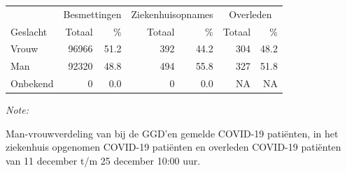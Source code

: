 \documentclass[
  english,
  man,floatsintext]{apa6}
\begin{document}
\begin{table}
\centering\begingroup\fontsize{11}{13}\selectfont

\begin{threeparttable}
\begin{tabular}{lrrrrrr}
\toprule
\multicolumn{1}{c}{ } & \multicolumn{2}{c}{Besmettingen} & \multicolumn{2}{c}{Ziekenhuisopnames} & \multicolumn{2}{c}{Overleden} \\
\cmidrule(l{3pt}r{3pt}){2-3} \cmidrule(l{3pt}r{3pt}){4-5} \cmidrule(l{3pt}r{3pt}){6-7}
Geslacht & Totaal & \% & Totaal & \% & Totaal & \%\\
\midrule
Vrouw & 96966 & 51.2 & 392 & 44.2 & 304 & 48.2\\
Man & 92320 & 48.8 & 494 & 55.8 & 327 & 51.8\\
Onbekend & 0 & 0.0 & 0 & 0.0 & NA & NA\\
\bottomrule
\end{tabular}
\begin{tablenotes}
\item \textit{Note: } 
\item Man-vrouwverdeling van bij de GGD’en gemelde COVID-19 patiënten, in het ziekenhuis opgenomen COVID-19 patiënten en overleden COVID-19 patiënten van 11 december t/m 25 december 10:00 uur.
\end{tablenotes}
\end{threeparttable}
\endgroup{}
\end{table}
\newpage
\end{document}
